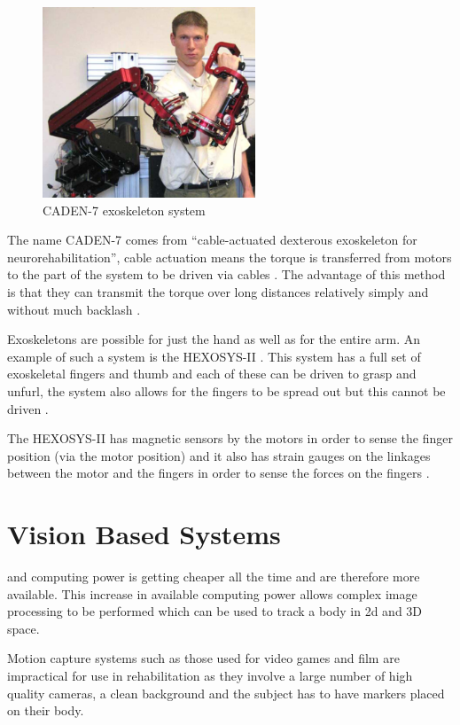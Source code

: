 \documentclass[journal]{IEEEtran}
\begin{document}
\begin{figure}[!h]
\centering
\includegraphics[width=2.5in]{CADEN7.png}
\caption{CADEN-7 exoskeleton system \cite{CADEN}}
\label{CADEN7_fig}
\end{figure}

The name CADEN-7 comes from ``cable-actuated dexterous exoskeleton for neurorehabilitation'', 
cable actuation means the torque is transferred from motors to the part of the system to be driven 
via cables \cite{CADEN}. The advantage of this method is that they can transmit the torque over long 
distances relatively simply and without much backlash \cite{CADEN}.

Exoskeletons are possible for just the hand as well as for the entire arm. An example of such a 
system is the HEXOSYS-II \cite{HandExo}. This system has a full set of exoskeletal fingers and thumb and 
each of these can be driven to grasp and unfurl, the system also allows for the fingers to be 
spread out but this cannot be driven \cite{HandExo}.

The HEXOSYS-II has magnetic sensors by the motors in order to sense the finger position (via 
the motor position) and it also has strain gauges on the linkages between the motor and the fingers 
in order to sense the forces on the fingers \cite{HandExo}.

\section{Vision Based Systems}
 and computing power is getting cheaper all the time and are therefore 
more available. This increase in available computing power allows complex image processing to be performed 
which can be used to track a body in 2d and 3D space.

Motion capture systems such as those used for video games and film are impractical for use in 
rehabilitation as they involve a large number of high quality cameras, a clean background and 
the subject has to have markers placed on their body.
\end{document}
